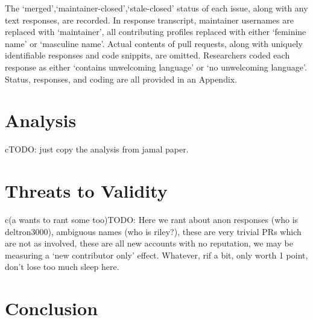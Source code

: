 \documentclass[journal,12pt,onecolumn,]{IEEEtran}
\begin{document}
The `merged',`maintainer-closed',`stale-closed' status of each issue, along with any text responses, are recorded.
In response transcript, maintainer usernames are replaced with `maintainer', all contributing profiles replaced with either `feminine name' or `masculine name'.
Actual contents of pull requests, along with uniquely identifiable responses and code snippits, are omitted.
Researchers coded each response as either `contains unwelcoming language' or `no unwelcoming language'.
Status, responses, and coding are all provided in an Appendix.

\section{Analysis}

cTODO: just copy the analysis from jamal paper.

\section{Threats to Validity}

c(a wants to rant some too)TODO: Here we rant about anon responses (who is deltron3000), ambiguous names (who is riley?), these are very trivial PRs which are not as involved, these are all new accounts with no reputation, we may be measuring a `new contributor only' effect.  Whatever, rif a bit, only worth 1 point, don't lose too much sleep here.

\section{Conclusion}
%



\end{document}
